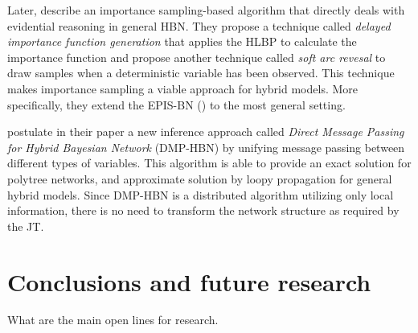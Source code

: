 \documentclass[a4paper,11pt]{article}
\begin{document}
Later, \cite{yuanmarek2007}  describe an importance sampling-based algorithm that directly deals with evidential reasoning in general HBN. They propose a technique called \textit{delayed importance function generation} that applies the HLBP to calculate the importance function and propose another technique called \textit{soft arc revesal} to draw samples when a deterministic variable has been observed. This technique makes importance sampling a viable approach for hybrid models. More specifically, they extend the EPIS-BN (\cite{yuandruzdzel2006}) to the most general setting. 

\cite{scalable2010} postulate in their paper a new inference approach called \textit{Direct Message Passing for Hybrid Bayesian Network} (DMP-HBN) by unifying message passing between different types of variables. This algorithm is able to provide an exact solution for polytree networks, and approximate solution by loopy propagation for general hybrid models. 
Since DMP-HBN is a distributed algorithm utilizing only local information, there is no need to transform the network structure as required by the JT.

\section{Conclusions and future research}

What are the main open lines for research.
\end{document}
